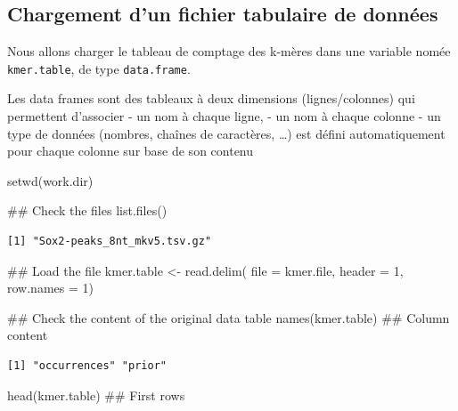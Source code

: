 \documentclass[]{article}
\newenvironment{Shaded}{\begin{snugshade}}{\end{snugshade}}
\newcommand{\KeywordTok}[1]{\textcolor[rgb]{0.94,0.87,0.69}{#1}}
\newcommand{\DataTypeTok}[1]{\textcolor[rgb]{0.87,0.87,0.75}{#1}}
\newcommand{\DecValTok}[1]{\textcolor[rgb]{0.86,0.86,0.80}{#1}}
\newcommand{\StringTok}[1]{\textcolor[rgb]{0.80,0.58,0.58}{#1}}
\newcommand{\NormalTok}[1]{\textcolor[rgb]{0.80,0.80,0.80}{#1}}
\begin{document}
\subsection{Chargement d'un fichier tabulaire de
données}\label{chargement-dun-fichier-tabulaire-de-donnees}

Nous allons charger le tableau de comptage des k-mères dans une variable
nomée \texttt{kmer.table}, de type \texttt{data.frame}.

Les data frames sont des tableaux à deux dimensions (lignes/colonnes)
qui permettent d'associer - un nom à chaque ligne, - un nom à chaque
colonne - un type de données (nombres, chaînes de caractères, \ldots{})
est défini automatiquement pour chaque colonne sur base de son contenu

\begin{Shaded}
\begin{Highlighting}[]
\KeywordTok{setwd}\NormalTok{(work.dir)}

\NormalTok{## Check the files}
\KeywordTok{list.files}\NormalTok{()}
\end{Highlighting}
\end{Shaded}

\begin{verbatim}
[1] "Sox2-peaks_8nt_mkv5.tsv.gz"
\end{verbatim}

\begin{Shaded}
\begin{Highlighting}[]
\NormalTok{## Load the file}
\NormalTok{kmer.table <-}\StringTok{ }\KeywordTok{read.delim}\NormalTok{(}
  \DataTypeTok{file =}\NormalTok{ kmer.file, }
  \DataTypeTok{header =} \DecValTok{1}\NormalTok{, }
  \DataTypeTok{row.names =} \DecValTok{1}\NormalTok{)}

\NormalTok{## Check the content of the original data table}
\KeywordTok{names}\NormalTok{(kmer.table) ## Column content}
\end{Highlighting}
\end{Shaded}

\begin{verbatim}
[1] "occurrences" "prior"      
\end{verbatim}

\begin{Shaded}
\begin{Highlighting}[]
\KeywordTok{head}\NormalTok{(kmer.table)  ## First rows}
\end{Highlighting}
\end{Shaded}
\end{document}
